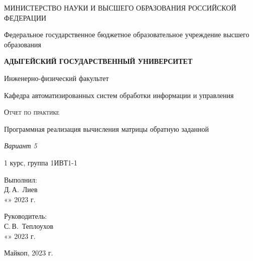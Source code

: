 \documentclass[12pt,a4paper]{scrartcl}
\begin{document}
 \begin{titlepage}
  \begin{center}
   \large
   МИНИСТЕРСТВО НАУКИ И ВЫСШЕГО ОБРАЗОВАНИЯ РОССИЙСКОЙ ФЕДЕРАЦИИ
   
   Федеральное государственное бюджетное образовательное учреждение высшего образования
   
   \textbf{АДЫГЕЙСКИЙ ГОСУДАРСТВЕННЫЙ УНИВЕРСИТЕТ}
   \vspace{0.25cm}
   
   Инженерно-физический факультет
   
   Кафедра автоматизированных систем обработки информации и управления
   \vfill

   \vfill
   
   \textsc{Отчет по практике}\\[2mm]
   
   {\LARGE Программная реализация вычисления матрицы обратную заданной
    \vspace{0.25cm}
   
   \textit{Вариант 5}}
   \bigskip
   
   1 курс, группа 1ИВТ1-1
  \end{center}
  \vfill
  
  \newlength{\ML}
  \hfill\begin{minipage}{0.5\textwidth}
   Выполнил:\\
   \underline{\hspace{\ML}} Д.\,А.~Лиев\\
   «\underline{\hspace{0.7cm}}» \underline{\hspace{2cm}} 2023 г.
  \end{minipage}%
  \bigskip
  
  \hfill\begin{minipage}{0.5\textwidth}
   Руководитель:\\
   \underline{\hspace{\ML}} С.\,В.~Теплоухов\\
   «\underline{\hspace{0.7cm}}» \underline{\hspace{2cm}} 2023 г.
  \end{minipage}%
  \vfill
  
  \begin{center}
   Майкоп, 2023 г.
  \end{center}
 \end{titlepage}
 
\end{document}
